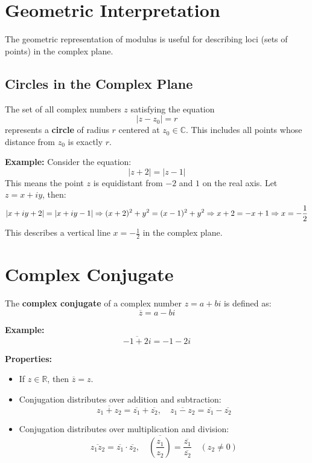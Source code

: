 \documentclass{article}
\begin{document}
\section*{Geometric Interpretation}

The geometric representation of modulus is useful for describing loci (sets of points) in the complex plane.

\subsection*{Circles in the Complex Plane}

The set of all complex numbers \( z \) satisfying the equation
\begin{equation}
|z - z_0| = r
\label{eq:circle}
\end{equation}
represents a \textbf{circle} of radius \( r \) centered at \( z_0 \in \mathbb{C} \). This includes all points whose distance from \( z_0 \) is exactly \( r \).

\textbf{Example:}
Consider the equation:
\[
|z + 2| = |z - 1|
\]
This means the point \( z \) is equidistant from \( -2 \) and \( 1 \) on the real axis. Let \( z = x + iy \), then:
\[
|x + iy + 2| = |x + iy - 1| \\
\Rightarrow (x + 2)^2 + y^2 = (x - 1)^2 + y^2 \\
\Rightarrow x + 2 = -x + 1 \\
\Rightarrow x = -\frac{1}{2}
\]
This describes a vertical line \( x = -\frac{1}{2} \) in the complex plane.

\section*{Complex Conjugate}

The \textbf{complex conjugate} of a complex number \( z = a + bi \) is defined as:
\begin{equation}
\overline{z} = a - bi
\label{eq:conjugate}
\end{equation}

\textbf{Example:}
\[
\overline{-1 + 2i} = -1 - 2i
\]

\textbf{Properties:}
\begin{itemize}
    \item If \( z \in \mathbb{R} \), then \( \overline{z} = z \).
    \item Conjugation distributes over addition and subtraction:
    \begin{equation}
    \overline{z_1 + z_2} = \overline{z_1} + \overline{z_2}, \quad 
    \overline{z_1 - z_2} = \overline{z_1} - \overline{z_2}
    \label{eq:conj_add_sub}
    \end{equation}
    \item Conjugation distributes over multiplication and division:
    \begin{equation}
    \overline{z_1 z_2} = \overline{z_1} \cdot \overline{z_2}, \quad
    \overline{\left(\frac{z_1}{z_2}\right)} = \frac{\overline{z_1}}{\overline{z_2}} \quad (z_2 \ne 0)
    \label{eq:conj_mult_div}
    \end{equation}
\end{itemize}
\end{document}
